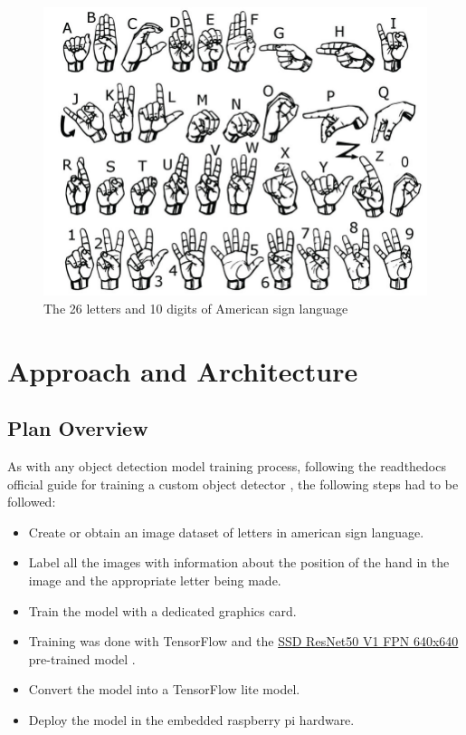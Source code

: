 \documentclass[10pt]{article}
\begin{document}
	\begin{figure}[H]
		\centering
		\includegraphics[scale=0.40]{imgs/The-26-letters-and-10-digits-of-American-Sign-Language-ASL.jpg}
		\caption{The 26 letters and 10 digits of American sign language}\label{fig:usage}
	\end{figure}

	\pagebreak

\section{Approach and Architecture}\label{sec:2}

	\subsection{Plan Overview}

		As with any object detection model training process, following the readthedocs official guide for training a custom object detector \cite{1}, the following steps had to be followed:
		\begin{itemize}
			\item Create or obtain an image dataset of letters in american sign language.
			\item Label all the images with information about the position of the hand in the image and the appropriate letter being made.
			\item Train the model with a dedicated graphics card.
			\item Training was done with TensorFlow and the \href{http://download.tensorflow.org/models/object_detection/tf2/20200711/ssd_resnet50_v1_fpn_640x640_coco17_tpu-8.tar.gz}{SSD ResNet50 V1 FPN 640x640} pre-trained model \cite{6}.
			\item Convert the model into a TensorFlow lite model.
			\item Deploy the model in the embedded raspberry pi hardware.
		\end{itemize}
\end{document}
